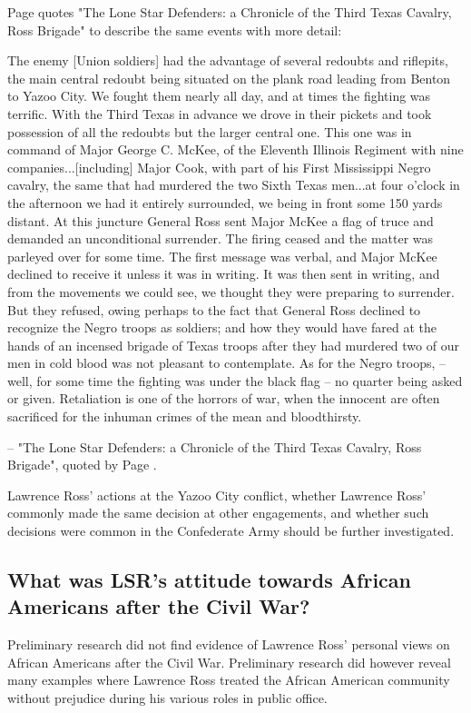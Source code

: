 \documentclass[12pt]{article}
\begin{document}
Page quotes "The Lone Star Defenders: a Chronicle of the Third Texas Cavalry, Ross Brigade" to describe the same events with more detail:
\begin{displayquote}
The enemy [Union soldiers] had the advantage of several redoubts and riflepits, the main central redoubt being situated on the plank road leading from Benton to Yazoo City.  We fought them nearly all day, and at times the fighting was terrific.  With the Third Texas in advance we drove in their pickets and took possession of all the redoubts but the larger central one.  This one was in command of Major George C. McKee, of the Eleventh Illinois Regiment with nine companies...[including] Major Cook, with part of his First Mississippi Negro cavalry, the same that had murdered the two Sixth Texas men...at four o'clock in the afternoon we had it entirely surrounded, we being in front some 150 yards distant. At this juncture General Ross sent Major McKee a flag of truce and demanded an unconditional surrender. The firing ceased and the matter was parleyed over for some time. The first message was verbal, and Major McKee declined to receive it unless it was in writing. It was then sent in writing, and from the movements we could see, we thought they were preparing to surrender. But they refused, owing perhaps to the fact that General Ross declined to recognize the Negro troops as soldiers; and how they would have fared at the hands of an incensed brigade of Texas troops after they had murdered two of our men in cold blood was not pleasant to contemplate. As for the Negro troops, -- well, for some time the fighting was under the black flag -- no quarter being asked or given.  Retaliation is one of the horrors of war, when the innocent are often sacrificed for the inhuman crimes of the mean and bloodthirsty.

-- "The Lone Star Defenders: a Chronicle of the Third Texas Cavalry, Ross Brigade", quoted by Page \cite[pg. 61--62]{page}.
\end{displayquote}

Lawrence Ross' actions at the Yazoo City conflict, whether Lawrence Ross' commonly made the same decision at other engagements, and whether such decisions were common in the Confederate Army should be further investigated. 

\subsection{What was LSR's attitude towards African Americans after the Civil War?}
Preliminary research did not find evidence of Lawrence Ross' personal views on African Americans after the Civil War. Preliminary research did however reveal many examples where Lawrence Ross treated the African American community without prejudice during his various roles in public office. 
\end{document}
